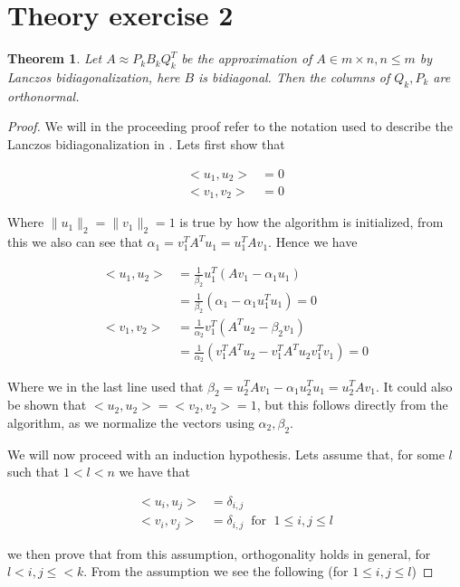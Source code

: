 \documentclass[11pt,a4paper,english]{elsarticle}%
\newtheorem{theorem}{Theorem}
\begin{document}
\section{Theory exercise 2}

\begin{theorem}
  Let $A \approx P_kB_kQ_k^T$ be the approximation of $A \in {m \times n}, n \leq m$ by Lanczos bidiagonalization, here $B$ is bidiagonal. Then the columns of $Q_k,P_k$ are orthonormal.
\end{theorem}

\begin{proof}
  We will in the proceeding proof refer to the notation used to describe the Lanczos bidiagonalization in \cite{Lanczos}. Lets first show that

  \begin{align*}
    <u_1,u_2> &= 0 \\
    <v_1,v_2> &= 0
  \end{align*}

  \noindent Where $\|u_1\|_2 = \|v_1\|_2 = 1$ is true by how the algorithm is initialized, from this we also can see that $\alpha_1 = v_1^TA^Tu_1 = u_1^TAv_1$. Hence we have


  \begin{align*}
    <u_1,u_2> &= \frac{1}{\beta_2}u_1^T(Av_1 - \alpha_1 u_1) \\
    &= \frac{1}{\beta_2} (\alpha_1 - \alpha_1u_1^Tu_1) = 0
    \\
    <v_1,v_2> &= \frac{1}{\alpha_2}v_1^T(A^Tu_2 - \beta_2 v_1) \\
    &= \frac{1}{\alpha_2}(v_1^TA^Tu_2 - v_1^TA^Tu_2v_1^Tv_1) = 0
  \end{align*}

  \noindent Where we in the last line used that $\beta_2 = u_2^TAv_1 - \alpha_1u_2^Tu_1 = u_2^TAv_1$. It could also be shown that $<u_2,u_2> = <v_2,v_2> = 1$, but this follows directly from the algorithm, as we normalize the vectors using $\alpha_2,\beta_2$.

  We will now proceed with an induction hypothesis. Lets assume that, for some $l$ such that $1<l<n$ we have that

  \begin{align*}
    <u_i,u_{j}> &= \delta_{i,j} \\
    <v_i,v_{j}> &= \delta_{i,j} \; \; \text{for } \; 1 \leq i,j \leq l
  \end{align*}

  we then prove that from this assumption, orthogonality holds in general, for $l < i,j \leq < k$. From the assumption we see the following (for $1 \leq i,j \leq l$)


\end{proof}
\end{document}
